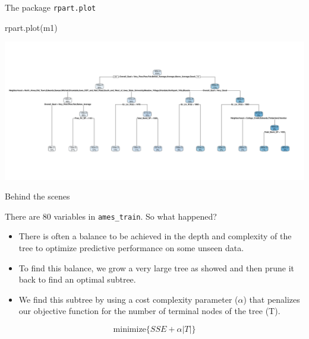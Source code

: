 \documentclass[
  10pt,
  ignorenonframetext,
]{beamer}
\newenvironment{Shaded}{}{}
\newcommand{\DataTypeTok}[1]{#1}
\newcommand{\KeywordTok}[1]{\textcolor[rgb]{0.00,0.00,1.00}{#1}}
\newcommand{\NormalTok}[1]{#1}
\newcommand{\OperatorTok}[1]{#1}
\newcommand{\StringTok}[1]{\textcolor[rgb]{0.00,0.50,0.50}{#1}}
\providecommand{\tightlist}{%
  \setlength{\itemsep}{0pt}\setlength{\parskip}{0pt}}
\begin{document}
\begin{frame}[fragile]{The package \texttt{rpart.plot}}
\protect\hypertarget{the-package-rpart.plot}{}

\begin{Shaded}
\begin{Highlighting}[]
\KeywordTok{rpart.plot}\NormalTok{(m1)}
\end{Highlighting}
\end{Shaded}

\includegraphics{c1_trees_bagging_files/figure-beamer/unnamed-chunk-7-1.pdf}

\end{frame}

\begin{frame}[fragile]{Behind the scenes}
\protect\hypertarget{behind-the-scenes}{}

There are 80 variables in \texttt{ames\_train}. So what happened?

\begin{itemize}
\tightlist
\item
  There is often a balance to be achieved in the depth and complexity of
  the tree to optimize predictive performance on some unseen data.
\item
  To find this balance, we grow a very large tree as showed and then
  prune it back to find an optimal subtree.
\item
  We find this subtree by using a cost complexity parameter (\(\alpha\))
  that penalizes our objective function for the number of terminal nodes
  of the tree (T).
\end{itemize}

\[
\text{minimize}\{SSE + \alpha|T|\}
\]

\begin{Shaded}
\end{Shaded}

\end{frame}
\end{document}
